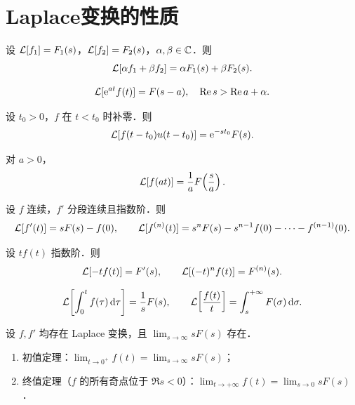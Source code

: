 \documentclass[12pt, a4paper, oneside, UTF8]{ctexbook}
\begin{document}
\section{Laplace变换的性质}

\begin{theorem}[线性性质]
设 $\mathcal{L}[f_1]=F_1(s)$，$\mathcal{L}[f_2]=F_2(s)$，$\alpha,\beta\in\mathbb{C}$．则
\[
\mathcal{L}[\alpha f_1 + \beta f_2] = \alpha F_1(s) + \beta F_2(s).
\]
\end{theorem}

\begin{theorem}
\[
\mathcal{L}[\mathrm{e}^{at}f(t)] = F(s-a),\quad \Re s > \Re a + \alpha.
\]
\end{theorem}

\begin{theorem}
设 $t_0>0$，$f$ 在 $t<t_0$ 时补零．则
\[
\mathcal{L}[f(t-t_0)u(t-t_0)] = \mathrm{e}^{-st_0}F(s).
\]
\end{theorem}

\begin{theorem}[相似性质]
对 $a>0$，
\[
\mathcal{L}[f(at)] = \frac{1}{a}F\!\left(\frac{s}{a}\right).
\]
\end{theorem}

\begin{theorem}[微分性质：$t$ 域]
设 $f$ 连续，$f'$ 分段连续且指数阶．则
\[
\mathcal{L}[f'(t)] = sF(s) - f(0),\qquad
\mathcal{L}[f^{(n)}(t)] = s^n F(s) - s^{n-1}f(0) - \cdots - f^{(n-1)}(0).
\]
\end{theorem}

\begin{theorem}[微分性质：$s$ 域]
设 $tf(t)$ 指数阶．则
\[
\mathcal{L}[-tf(t)] = F'(s),\qquad
\mathcal{L}[(-t)^n f(t)] = F^{(n)}(s).
\]
\end{theorem}

\begin{theorem}[积分性质]
\[
\mathcal{L}\!\left[\int_0^t f(\tau)\,\mathrm{d}\tau\right] = \frac{1}{s}F(s),\qquad
\mathcal{L}\!\left[\frac{f(t)}{t}\right] = \int_s^{+\infty} F(\sigma)\,\mathrm{d}\sigma.
\]
\end{theorem}

\begin{theorem}[初值与终值定理]
设 $f,f'$ 均存在 Laplace 变换，且 $\lim_{s\to\infty} sF(s)$ 存在．
\begin{enumerate}
    \item 初值定理：$\displaystyle\lim_{t\to 0^+} f(t) = \lim_{s\to\infty} sF(s)$；
    \item 终值定理（$f$ 的所有奇点位于 $\Re s<0$）：$\displaystyle\lim_{t\to+\infty} f(t) = \lim_{s\to 0} sF(s)$．
\end{enumerate}
\end{theorem}
\end{document}
